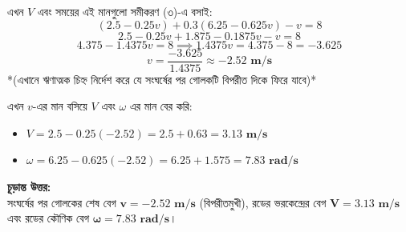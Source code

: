\documentclass[12pt, a4paper]{article}
\begin{document}
\begin{tcolorbox}[solutionbox={সমাধান (Solution)}]
এখন $V$ এবং সময়ের এই মানগুলো সমীকরণ (৩)-এ বসাই:
\[ (2.5 - 0.25v) + 0.3(6.25 - 0.625v) - v = 8 \]
\[ 2.5 - 0.25v + 1.875 - 0.1875v - v = 8 \]
\[ 4.375 - 1.4375v = 8 \implies 1.4375v = 4.375 - 8 = -3.625 \]
\[ v = \frac{-3.625}{1.4375} \approx \mathbf{-2.52\text{ m/s}} \]
*(এখানে ঋণাত্মক চিহ্ন নির্দেশ করে যে সংঘর্ষের পর গোলকটি বিপরীত দিকে ফিরে যাবে)*

এখন $v$-এর মান বসিয়ে $V$ এবং $\omega$ এর মান বের করি:
\begin{itemize}[leftmargin=*, parsep=0.3ex]
    \item $V = 2.5 - 0.25(-2.52) = 2.5 + 0.63 = \mathbf{3.13\text{ m/s}}$
    \item $\omega = 6.25 - 0.625(-2.52) = 6.25 + 1.575 = \mathbf{7.83\text{ rad/s}}$
\end{itemize}

\vspace{1em}
\begin{center}
\end{center}
\vspace{1em}

\vspace{1em}
\begin{tcolorbox}[answerbox]
\textbf{চূড়ান্ত উত্তর:} \\
সংঘর্ষের পর গোলকের শেষ বেগ $\mathbf{v = -2.52\text{ m/s}}$ (বিপরীতমুখী), রডের ভরকেন্দ্রের বেগ $\mathbf{V = 3.13\text{ m/s}}$ এবং রডের কৌণিক বেগ $\mathbf{\omega = 7.83\text{ rad/s}}$।
\end{tcolorbox}
\end{tcolorbox}
\end{document}
